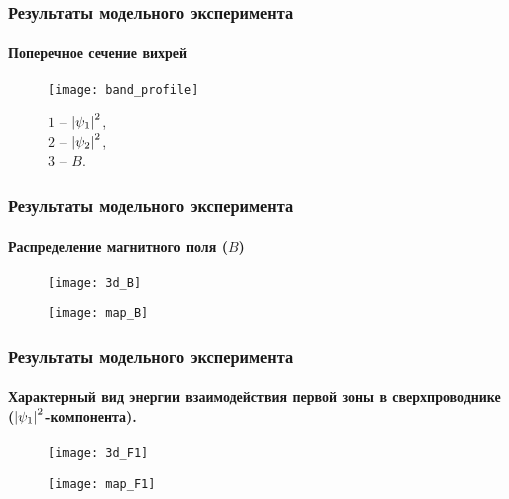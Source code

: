 \begin{frame}
    \frametitle{Результаты модельного эксперимента}
    \framesubtitle{Поперечное сечение вихрей}
    \begin{figure}[h]
        \begin{minipage}[h]{0.75\linewidth}
            \center\texttt{[image: band\_profile]}
        \end{minipage}
        \begin{minipage}[h]{0.15\linewidth}
            \( 1 \) -- \( \left| \psi_1 \right|^2 \), \\ 
            \( 2 \) -- \( \left| \psi_2 \right|^2 \), \\
            \( 3 \) -- \( B \).
        \end{minipage}
    \end{figure}
\end{frame}

\begin{frame}
    \frametitle{Результаты модельного эксперимента}
    \framesubtitle{Распределение магнитного поля (\( B \))}
    \begin{figure}[h]
        \begin{minipage}[h]{0.49\linewidth}
            \center\texttt{[image: 3d\_B]}
        \end{minipage}
        \hfill
        \begin{minipage}[h]{0.49\linewidth}
            \center\texttt{[image: map\_B]}
        \end{minipage}
    \end{figure}
\end{frame}

\begin{frame}
    \frametitle{Результаты модельного эксперимента}
    \framesubtitle{Характерный вид энергии взаимодействия первой зоны в 
        сверхпроводнике (\( \left| \psi_1 \right|^2 \)-компонента).}
    \begin{figure}[h]
        \begin{minipage}[h]{0.49\linewidth}
            \center\texttt{[image: 3d\_F1]}
        \end{minipage}
        \hfill
        \begin{minipage}[h]{0.49\linewidth}
            \center\texttt{[image: map\_F1]}
        \end{minipage}
    \end{figure}
\end{frame}

